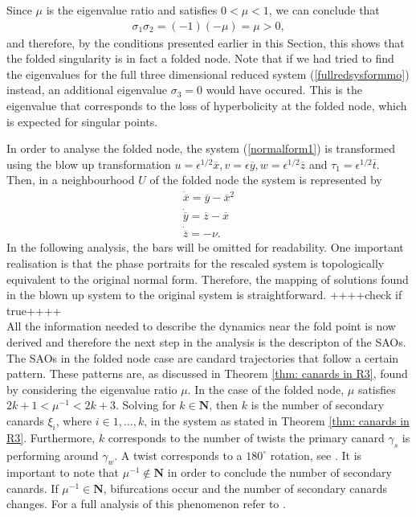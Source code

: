 Since $\mu$ is the eigenvalue ratio and satisfies $0< \mu < 1$, we can conclude that
\begin{align*}
\sigma_1\sigma_2 = (-1)(-\mu)=\mu >0,
\end{align*}
and therefore, by the conditions presented earlier in this Section, this shows that the folded singularity is in fact a folded node.
Note that if we had tried to find the eigenvalues for the full three dimensional reduced system (\ref{fullredsysformmo}) instead, an additional eigenvalue $\sigma_3=0$ would have occured. This is the eigenvalue that corresponds to the loss of hyperbolicity at the folded node, which is expected for singular points.

In order to analyse the folded node, the system (\ref{normalform1}) is transformed using the blow up transformation $u= \epsilon^{1/2}\overline{x}, v=\epsilon \overline{y}, w= \epsilon^{1/2} \overline{z}$ and $ \tau_1 = \epsilon^{1/2} \overline{t}$.
Then, in a neighbourhood $U$ of the folded node the system is represented by
\begin{align*}
\dot{\overline{x}}= \overline{y} - \overline{x}^2\\
\dot{\overline{y}}=\overline{z} - \overline{x} \\
\dot{\overline{z}}= - \nu.
\end{align*}
In the following analysis, the bars will be omitted for readability.
One important realisation is that the phase portraits for the rescaled system is topologically equivalent to the original normal form. Therefore, the mapping of solutions  found in the blown up system to the original system is straightforward. ++++check if true++++\\

All the information needed to describe the dynamics near the fold point is now derived and therefore the next step in the analysis is the descripton of the SAOs. The SAOs in the folded node case are candard trajectories that follow a certain pattern.
These patterns are, as discussed in Theorem \ref{thm: canards in R3}, found by considering the eigenvalue ratio $\mu$.
In the case of the folded node, $\mu$ satisfies $2k+1 < \mu^{-1} < 2k +3 $. Solving for $k \in \mathbf{N}$, then $k$ is the number of secondary canards $\xi_i$, where $i \in 1,...,k$, in the system as stated in Theorem \ref{thm: canards in R3}. Furthermore, $k$ corresponds to the number of twists the primary canard $\gamma_s$ is performing around $\gamma_w$. A twist corresponds to a $180^{\circ}$ rotation, see \citet{kuehn}. It is important to note that $\mu^{-1} \notin \mathbf{N}$ in order to conclude the number of secondary canards.
If $\mu^{-1} \in \mathbf{N}$, bifurcations occur and the number of secondary canards changes. For a full analysis of this phenomenon refer to \citep{wechselberger2005}.

